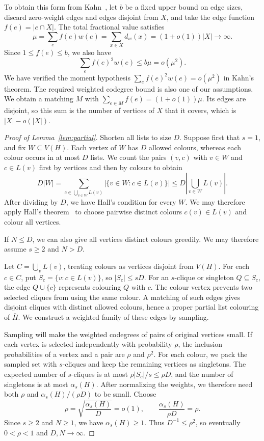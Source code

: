 \documentclass[11pt]{article}
\numberwithin{equation}{section}
\newcommand{\ov}[1]{\overline{#1}}
\begin{document}
To obtain this form from Kahn~\cite[Theorem~1.5]{KahnLP}, let $b$ be a fixed upper bound on edge sizes, discard zero-weight edges and edges disjoint from $X$, and take the edge function $f(e)=|e\cap X|$. The total fractional value satisfies
\[
 \mu=\sum_e f(e)w(e)
 =\sum_{x\in X}d_w(x)
 =(1+o(1))|X|\longrightarrow\infty.
\]
Since $1\le f(e)\le b$, we also have
\[
 \sum_e f(e)^2w(e)\le b\mu=o(\mu^2).
\]
  {We have verified the moment hypothesis $\sum_e f(e)^2w(e)=o(\mu^2)$ in Kahn's theorem. The required weighted codegree bound is also one of our assumptions.} We obtain a matching $M$ with $\sum_{e\in M}f(e)=(1+o(1))\mu$. Its edges are disjoint, so this sum is the number of vertices of $X$ that it covers, which is $|X|-o(|X|)$.

\begin{proof}[Proof of Lemma~\ref{lem:partial}]
Shorten all lists to size $D$. Suppose first that $s=1$, and fix $W\subseteq V(H)$. Each vertex of $W$ has $D$ allowed colours, whereas each colour occurs in at most $D$ lists. We count the pairs $(v,c)$ with $v\in W$ and $c\in L(v)$ first by vertices and then by colours to obtain
\[
 D|W|
 =\sum_{c\in\bigcup_{v\in W}L(v)}
       |\{v\in W:c\in L(v)\}|
 \le D\left|\bigcup_{v\in W}L(v)\right|.
\]
After dividing by $D$, we have Hall's condition for every $W$. We may therefore apply Hall's theorem~\cite{Hall1935} to choose pairwise distinct colours $c(v)\in L(v)$ and colour all vertices.
 
If $N\le D$, we can also give all vertices distinct colours greedily. We may therefore assume $s\ge2$ and $N>D$.

Let $C=\bigcup_vL(v)$, treating colours as vertices disjoint from $V(H)$. For each $c\in C$, put $S_c=\{v:c\in L(v)\}$, so $|S_c|\le sD$. For an $s$-clique or singleton $Q\subseteq S_c$, the edge $Q\cup\{c\}$ represents colouring $Q$ with $c$. The colour vertex prevents two selected cliques from using the same colour. A matching of such edges gives disjoint cliques with distinct allowed colours, hence a proper partial list colouring of $\ov H$. We construct a weighted family of these edges by sampling.

Sampling will make the weighted codegrees of pairs of original vertices small. If each vertex is selected independently with probability $\rho$, the inclusion probabilities of a vertex and a pair are $\rho$ and $\rho^2$. For each colour, we pack the sampled set with $s$-cliques and keep the remaining vertices as singletons. The expected number of $s$-cliques is at most $\rho|S_c|/s\le\rho D$, and the number of singletons is at most $\alpha_s(H)$. After normalizing the weights, we therefore need both $\rho$ and $\alpha_s(H)/(\rho D)$ to be small. Choose
\[
 \rho=\sqrt{\frac{\alpha_s(H)}D}=o(1),
 \qquad
 \frac{\alpha_s(H)}{\rho D}=\rho.
\]
Since $s\ge2$ and $N\ge1$, we have $\alpha_s(H)\ge1$. Thus $D^{-1}\le\rho^2$, so eventually $0<\rho<1$ and $D,N\to\infty$.


\end{proof}
\end{document}
